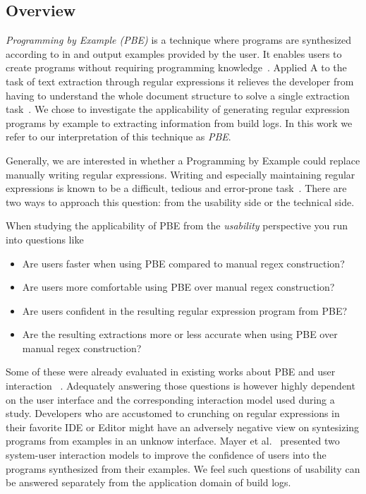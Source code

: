 \documentclass[\myrootdir/main.tex]{subfiles}
\begin{document}
\subsection*{Overview}
\emph{Programming by Example (PBE)} is a technique where programs are synthesized according to in and output examples provided by the user. It enables users to create programs without requiring programming knowledge~\cite{mayer2015user}. Applied A to the task of text extraction through regular expressions it relieves the developer from having to understand the whole document structure to solve a single extraction task~\cite{le2014flashextract:}.
We chose to investigate the applicability of generating regular expression programs by example to extracting information from build logs. In this work we refer to our interpretation of this technique as \emph{PBE}. 

Generally, we are interested in whether a Programming by Example could replace manually writing regular expressions.
Writing and especially maintaining regular expressions is known to be a difficult, tedious and error-prone task~\cite{michael2019regexes}.
There are two ways to approach this question: from the usability side or the technical side.

When studying the applicability of PBE from the \emph{usability} perspective you run into questions like
\begin{itemize}
	\item Are users faster when using PBE compared to manual regex construction?
	\item Are users more comfortable using PBE over manual regex construction?
	\item Are users confident in the resulting regular expression program from PBE?
	\item Are the resulting extractions more or less accurate when using PBE over manual regex construction?
\end{itemize}
Some of these were already evaluated in existing works about PBE and user interaction~\cite{mayer2015user} .
Adequately answering those questions is however highly dependent on the user interface and the corresponding interaction model used during a study.
Developers who are accustomed to crunching on regular expressions in their favorite IDE or Editor might have an adversely negative view on syntesizing programs from examples in an unknow interface.
Mayer et al.~\cite{mayer2015user} presented two system-user interaction models to improve the confidence of users into the programs synthesized from their examples.
We feel such questions of usability can be answered separately from the application domain of build logs.
\end{document}
